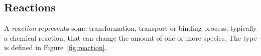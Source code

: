 \documentclass[10pt]{cekarticle}
\newcommand{\vref}[1]{\ref{#1}}
\begin{document}
%
%
%
%
%
%
%
%
%
%
%
%
%

\subsection{Reactions}
\label{sec:reactions}

A \emph{reaction} represents some transformation, transport or
binding process, typically a chemical reaction, that can change
the amount of one or more species.  The  type is
defined in Figure~\vref{fig:reaction}.
\end{document}
